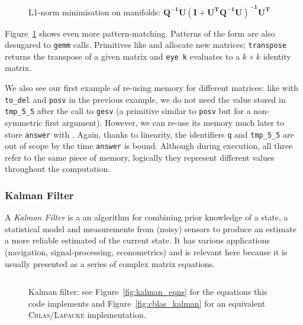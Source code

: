 \begin{figure}[t]
    \centering
    \inputminted[fontsize=\small]{ocaml}{../../examples/l1_norm_min.lt}
    \caption{L1-norm minimisation on manifolds:
        $\mathbf{Q^{-1}U(I+U^TQ^{-1}U)^{-1}U^T}$}\label{fig:lang_l1_norm_min}
\end{figure}

Figure~\ref{fig:lang_l1_norm_min} shows even more pattern-matching. Patterns of
the form  are also desugared to
\texttt{gemm} calls. Primitives like  and  allocate new matrices;
\texttt{transpose} returns the transpose of a given matrix and \texttt{eye k}
evaluates to a $k \times k$ identity matrix.

We also see our first example of re-using memory for different matrices: like
with \texttt{to\_del} and \texttt{posv} in the previous example, we do not need
the value stored in \texttt{tmp\_5\_5} after the call to \texttt{gesv} (a
primitive similar to \texttt{posv} but for a non-symmetric first argument).
However, we can re-use its memory much later to store \texttt{answer} with
. Again, thanks to
linearity, the identifiers \texttt{q} and \texttt{tmp\_5\_5} are out of scope
by the time \texttt{answer} is bound. Although during execution, all three
refer to the same piece of memory, logically they represent different values
throughout the computation.

\subsubsection{Kalman Filter}

A \emph{Kalman Filter}\cite{kalman} is a an algorithm for combining prior
knowledge of a state, a statistical model and measurements from (noisy) sensors
to produce an estimate a more reliable estimated of the current state.  It has
various applications (navigation, signal-processing, econometrics) and is
relevant here because it is usually presented as a series of complex matrix
equations.

\begin{figure}[t]
    \centering
    \inputminted[fontsize=\small]{ocaml}{../../examples/kalman.lt}
    \caption{Kalman filter: see Figure~\ref{fig:kalman_eqns} for the
        equations this code implements and Figure~\ref{fig:cblas_kalman}
        for an equivalent \textsc{Cblas/Lapacke} implementation.}\label{fig:lang_kalman}
\end{figure}


